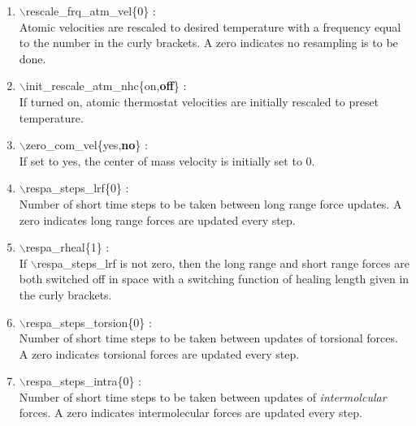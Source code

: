 \begin{itemize}
\begin{enumerate}
 \vspace{0.15in} \Large
 \item   $\backslash$rescale\_frq\_atm\_vel\{0\} : \\
    \large
    Atomic velocities are rescaled to desired temperature
    with a frequency equal to the number in the
    curly brackets.  A zero indicates no resampling is to be done.

 \vspace{0.15in} \Large
 \item   $\backslash$init\_rescale\_atm\_nhc\{on,{\bf off}\} : \\
    \large
    If turned on, atomic thermostat velocities are initially rescaled to 
    preset temperature.

 \vspace{0.15in} \Large
 \item   $\backslash$zero\_com\_vel\{yes,{\bf no}\} : \\
    \large
    If set to yes, the center of mass velocity is initially set to 0.

 \vspace{0.15in} \Large
 \item   $\backslash$respa\_steps\_lrf\{0\} : \\
    \large
    Number of short time steps to be taken between long range force updates.
    A zero indicates long range forces are updated every step.

 \vspace{0.15in} \Large
 \item   $\backslash$respa\_rheal\{1\} : \\
   \large
    If $\backslash$respa\_steps\_lrf is not zero, then the long range 
    and short range forces are both switched off in space with a switching
    function of healing length given in the curly brackets.

 \vspace{0.15in} \Large
 \item   $\backslash$respa\_steps\_torsion\{0\} : \\
   \large
    Number of short time steps to be taken between updates of torsional
    forces.  A zero indicates torsional forces are updated every step.

 \vspace{0.15in} \Large
  \item   $\backslash$respa\_steps\_intra\{0\} : \\
   \large
    Number of short time steps to be taken between updates of 
    {\it intermolcular} forces.  A zero indicates intermolecular forces are 
    updated every step.


\end{enumerate}
\end{itemize}
